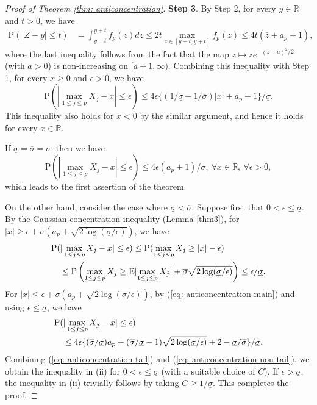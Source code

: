 \documentclass[11pt,reqno]{amsart}
\theoremstyle{definition}
\newcommand{\Ep}{{\mathrm{E}}}
\renewcommand{\Pr}{{\mathrm{P}}}
\newcommand{\RR}{\mathbb{R}}
\begin{document}
\begin{proof}[Proof of Theorem \ref{thm: anticoncentration}]
{\bf Step 3}. By Step 2, for every $y \in \RR$ and $t > 0$,  we have
\begin{align*}
\Pr\left( | Z - y | \leq t \right) &= \int_{y -t}^{y+t} f_{p}(z) dz
\leq 2 t \max_{z \in [y -t, y+t]}f_{p}(z)  \leq 4 t (\bar{z}+ a_p + 1),
\end{align*}
where the last inequality follows from the fact that the map $z \mapsto z e^{-(z-a)^{2}/2}$ (with $a > 0$) is non-increasing on $[a+1,\infty)$.
Combining this inequality with  Step 1, for every $x \geq 0$ and $\epsilon > 0$, we have
\begin{equation}
\Pr ( | \max_{1 \leq j \leq p}X_{j} - x | \leq \epsilon ) \leq 4 \epsilon \{  (1/\underline{\sigma}-1/\overline{\sigma}) |x|+a_p + 1 \} /\underline{\sigma}.  \label{eq: anticoncentration main}
\end{equation}
This inequality also holds for $x<0$ by the similar argument, and hence it holds
for every $x \in \RR$.

If  $\underline{\sigma}=\overline{\sigma} =\sigma$, then we have
\begin{equation*}
\Pr ( | \max_{1 \leq j \leq p}X_{j} - x | \leq \epsilon ) \leq 4 \epsilon (a_p + 1)/\sigma, \ \forall  x \in \RR, \ \forall \epsilon > 0,
\end{equation*}
which leads to the first assertion of the theorem.

On the other hand, consider the case where $\underline{\sigma} < \overline{\sigma}$. Suppose first that $0 < \epsilon \leq \underline{\sigma}$.
By the Gaussian concentration inequality (Lemma \ref{thm3}), for $|x|\geq \epsilon+\overline \sigma(a_p+\sqrt{2\log(\underline{\sigma}/\epsilon)})$, we have
\begin{align}
&\Pr ( | \max_{1 \leq j \leq p} X_{j}-x|\leq\epsilon ) \leq \Pr (\max_{1 \leq j \leq p}X_{j} \geq |x|-\epsilon ) \notag \\
&\quad \leq \Pr \left (\max_{1 \leq j \leq p}X_{j}\geq \Ep[\max_{1 \leq j \leq p}X_{j}] +\overline{\sigma}\sqrt{2\log(\underline{\sigma}/\epsilon)} \right ) \leq \epsilon/\underline{\sigma}. \label{eq: anticoncentration tail}
\end{align}
For  $|x| \leq \epsilon+\overline \sigma(a_p+\sqrt{2\log(\underline{\sigma}/\epsilon)})$, by  (\ref{eq: anticoncentration main}) and using $\epsilon \leq \underline{\sigma}$, we have
\begin{align}
&\Pr ( | \max_{1 \leq j \leq p}X_{j} - x | \leq \epsilon ) \notag \\
&\quad \leq 4 \epsilon \{ (\overline{\sigma}/\underline{\sigma}) a_{p} +  (\overline{\sigma}/\underline{\sigma}-1)\sqrt{2\log(\underline{\sigma}/\epsilon)}   + 2 - \underline{\sigma}/\overline{\sigma}\}/\underline{\sigma}.
 \label{eq: anticoncentration non-tail}
\end{align}
Combining (\ref{eq: anticoncentration tail}) and (\ref{eq: anticoncentration non-tail}), we obtain the inequality in (ii) for $0 < \epsilon \leq \underline{\sigma}$ (with a suitable choice of $C$). If $\epsilon> \underline{\sigma}$, the inequality in (ii) trivially follows by taking $C \geq 1/\underline{\sigma}$.  This completes the proof.
\end{proof}
\end{document}
